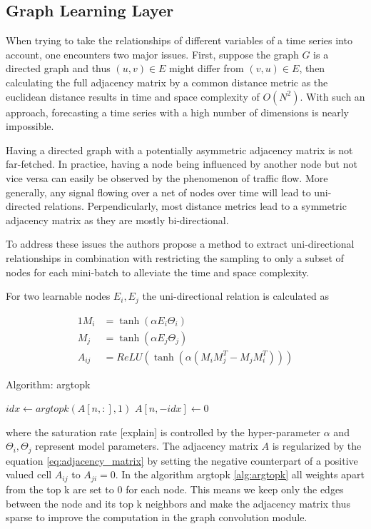 \documentclass[letterpaper,twocolumn,11pt]{article}
\begin{document}
    \subsection{Graph Learning Layer}
    When trying to take the relationships of different variables of a time series into account, one encounters two major issues.
    First, suppose the graph $G$ is a directed graph and thus $(u,v)\in E$ might differ from $(v,u)\in E$,
    then calculating the full adjacency matrix by a common distance metric as the euclidean distance results in time and space complexity of $O(N^2)$.
    With such an approach, forecasting a time series with a high number of dimensions is nearly impossible.

    Having a directed graph with a potentially asymmetric adjacency matrix is not far-fetched.
    In practice, having a node being influenced by another node but not vice versa can easily be observed by the phenomenon of traffic flow.
    More generally, any signal flowing over a net of nodes over time will lead to uni-directed relations.
    Perpendicularly, most distance metrics lead to a symmetric adjacency matrix as they are mostly bi-directional.

    To address these issues the authors propose a method to extract uni-directional relationships in combination with restricting the sampling
    to only a subset of nodes for each mini-batch to alleviate the time and space complexity.

    For two learnable nodes $E_i, E_j$ the uni-directional relation is calculated as

    \begin{alignat}{1}
        M_i &= \tanh (\alpha E_i \Theta_i) \\
        M_j &= \tanh (\alpha E_j \Theta_j)  \\
        A_{ij} &= ReLU(\tanh (\alpha(M_i M_j^T - M_j M_i^T))) \label{eq:adjacency_matrix}
    \end{alignat}
    \begin{algorithm}
        \caption{Algorithm: argtopk}\label{alg:argtopk}
        \begin{algorithmic}[1]
                \State $idx \gets argtopk(A[n,:], 1)$
                \State $A[n, -idx] \gets 0$
            \EndFor
        \end{algorithmic}
    \end{algorithm}
    where the saturation rate [explain] is controlled by the hyper-parameter $\alpha$ and  $\Theta_i, \Theta_j$ represent
    model parameters. The adjacency matrix $A$ is regularized by the equation \ref{eq:adjacency_matrix}
    by setting the negative counterpart of a positive valued cell $A_{ij}$ to $A_{ji} = 0$. In the algorithm argtopk \ref{alg:argtopk}
    all weights apart from the top k are set to 0 for each node.
    This means we keep only the edges between the node and its top k neighbors and make the adjacency matrix thus sparse to improve the computation in the graph convolution module.
\end{document}
